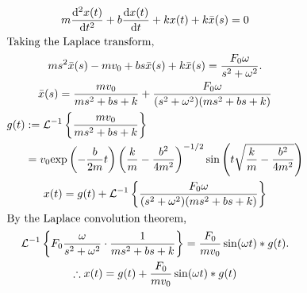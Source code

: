 \documentclass[12pt]{article}
\newcommand*\diff{\mathop{}\!\mathrm{d}}
\newenvironment{problem}[2][Problem]{\begin{trivlist}
\item[\hskip \labelsep {\bfseries #1}\hskip \labelsep {\bfseries #2.}]}{\end{trivlist}}
\begin{document}
\begin{problem}{3.b}
\end{problem}
\begin{gather*}
	m \frac{\diff^2 x(t)}{\diff t^2} + b \frac{\diff x(t)}{\diff t} + kx(t)
		+ k\bar{x}(s) = 0 \\
	\intertext{Taking the Laplace transform,}
	m s^2\bar{x}(s) - m v_0 
		+ b s\bar{x}(s)
		+ k\bar{x}(s) 
		=
		\frac{F_0 \omega}{s^2 + \omega^2}.
	\\
	\bar{x}(s) = \frac{m v_0}{
			ms^2 + bs + k
		}
		+
		\frac{F_0 \omega}{(s^2 + \omega^2)(ms^2 + bs + k)}
	\\
	\begin{aligned}
	g(t) &:= 
		\mathcal{L}^{-1} \left\{
			\frac{m v_0}{ ms^2 + bs + k }
		\right\}
	\\
	&= 
		v_0
		\text{exp} \left(
			-\frac{b}{2m} t
		\right)
		\left( 
			\frac{k}{m} - \frac{b^2}{4m^2}
		\right)^{-1/2}
		\sin \left(
			t\sqrt{\frac{k}{m} - \frac{b^2}{4m^2}}
		\right)
	\end{aligned}
	\\
	x(t) = 
		g(t)
		+
		\mathcal{L}^{-1} \left\{ 
			\frac{F_0 \omega}{(s^2 + \omega^2)(ms^2 + bs + k)}
		\right\}
	\\
	\intertext{By the Laplace convolution theorem,}
	\mathcal{L}^{-1} \left\{
			F_0
			\frac{\omega}{s^2 + \omega^2}
			\cdot
			\frac{1}{ms^2 + bs + k}
		\right\}
		= 
		\frac{F_0}{mv_0} \sin(\omega t) \ast g(t).
	\\
	\therefore x(t) = 
		g(t)
		+
		\frac{F_0}{mv_0} \sin(\omega t) \ast g(t)
	\\
\end{gather*}
\end{document}
